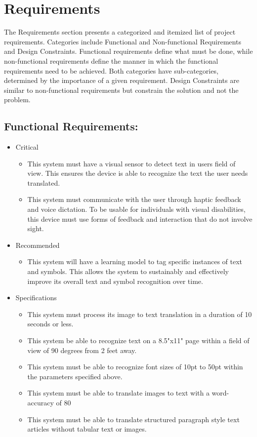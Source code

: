 \chapter{Requirements}
The Requirements section presents a categorized and itemized list of project requirements. Categories include Functional and Non-functional Requirements and Design Constraints. Functional requirements define what must be done, while non-functional requirements define the manner in which the functional requirements need to be achieved. Both categories have sub-categories, determined by the importance of a given requirement. Design Constraints are similar to non-functional requirements but constrain the solution and not the problem.
\section{Functional Requirements:}
\begin{itemize}
\item Critical
	\begin{itemize}
	\item This system must have a visual sensor to detect text in users field of view. This ensures the device is able to recognize the text the user needs translated.
	\item This system must communicate with the user through haptic feedback and voice dictation. To be usable for individuals with visual disabilities, this device must use forms of feedback and interaction that do not involve sight.
    \end{itemize}
\item Recommended
	\begin{itemize}
	\item This system will have a learning model to tag specific instances of text and symbols. This allows the system to sustainably and effectively improve its overall text and symbol recognition over time.
	\end{itemize}
\item Specifications
	\begin{itemize}
	\item This system must process its image to text translation in a duration of 10 seconds or less.
	\item This system be able to recognize text on a 8.5"x11" page within a field of view of 90 degrees from 2 feet away.
	\item This system must be able to recognize font sizes of 10pt to 50pt within the parameters specified above.
	\item This system must be able to translate images to text with a word-accuracy of 80%
	\item This system must be able to translate structured paragraph style text articles without tabular text or images. 
	\end{itemize}
\end{itemize}

